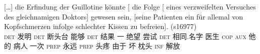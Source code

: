 \ex 
{\raggedright
\gll {}[\ldots] die Erfindung der Guillotine könnte [ die Folge [ eines verzweifelten
    Versuches des gleichnamigen Doktors] gewesen sein, [seine Patienten ein für allemal von
    Kopfschmerzen infolge schlechter Kissen zu befreien]. (s16977)\\
    {}  \textsc{det} 发明 \textsc{det} 断头台 能够 {} \textsc{det} 结果 {} 一 绝望 尝试 \textsc{det} 相同.名字 医生 \textsc{cop} \textsc{aux} \spacebr{}他的 病人
一次 \textsc{prep} 永远 \textsc{prep} 头疼 由于 坏 枕头 \textsc{inf} 解放\\
\par}
\zl

